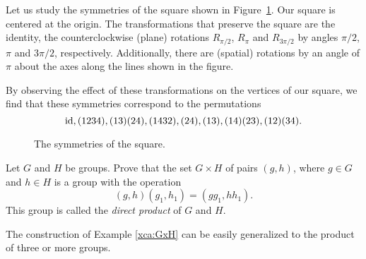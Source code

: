 \begin{example}
Let us study the symmetries of the square shown in Figure~\ref{fig:square}. Our square is centered at the origin. The transformations that preserve the square are the identity, the counterclockwise (plane) rotations
$R_{\pi/2}$, $R_{\pi}$ and $R_{3\pi/2}$ by angles 
$\pi/2$, $\pi$ and $3\pi/2$, respectively. Additionally, there are (spatial) rotations by an angle of $\pi$ about the axes along the lines shown in the figure. 
    
By observing the effect of these transformations on the vertices of our square, we find that these symmetries correspond to the permutations
\[
\operatorname{id}, (1234), (13)(24), (1432), (24), (13), (14)(23), (12)(34).
\]
\end{example}

\begin{figure}[ht]
\caption{The symmetries of the square.}
\label{fig:square}
\end{figure}


\begin{exercise}
\label{xca:GxH}
        Let $G$ and $H$ be groups. Prove that 
        the set 
        $G\times H$
        of pairs $(g,h)$, where $g\in G$ and 
        $h\in H$ is a group with
        the operation
        \[
                (g,h)(g_1,h_1)=(gg_1,hh_1).
        \]
        This group is called the 
        \emph{direct product} of $G$ and $H$.
\end{exercise}

The construction of Example \ref{xca:GxH}
can be easily generalized to the product of 
three or more groups. 

